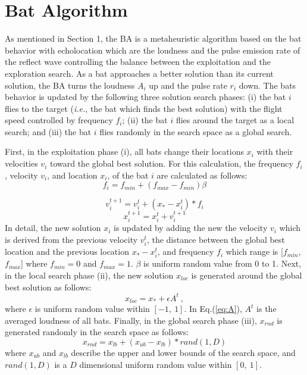 \section{Bat Algorithm}
As mentioned in Section 1, the BA is a metaheuristic algorithm based on the bat behavior with echolocation which are the loudness and the pulse emission rate of the reflect wave controlling the balance between the exploitation and the exploration search. As a bat approaches a better solution than its current solution, the BA turns the loudness $A_i$ up and the pulse rate $r_i$ down. The bats behavior is updated by the following three solution search phases: (i) the bat $i$ flies to the target (\textit{i.e.}, the bat which finds the best solution) with the flight speed controlled by frequency $f_i$; (ii) the bat $i$ flies around the target as a local search; and (iii) the bat $i$ flies randomly in the search space as a global search.

First, in the exploitation phase (i), all bats change their locations $x_i$ with their velocities $v_i$ toward the global best solution. For this calculation, the frequency $f_i$, velocity $v_i$, and location $x_i$, of the bat $i$ are calculated as follows:
\begin{equation}
f_{i} =f_{min}+(f_{max}-f_{min}) \beta
\label{eq:freq} 
\end{equation}

\begin{equation}
v_i^{t+1}=v_i^t+(x_*-x_i^t)* f_i
\label{eq:vi}
\end{equation}
\begin{equation}
x_i^{t+1}=x_i^t+v_i^{t+1}
\label{eq:xi}
\end{equation}
In detail, the new solution $x_i$ is updated by adding the new the velocity ${v_i}$ which is derived from the previous velocity $v_i^t$, the distance between the global best location and the previous location $x_*-x_i^t$, and frequency $f_i$ which range is [${f_{min}}$, ${f_{max}}$] where ${f_{min}}=0$ and ${f_{max}}=1$. $\beta $ is uniform random value from 0 to 1. Next, in the local search phase (ii), the new solution $x_{loc}$ is generated around the global best solution as follows:
\begin{equation}
x_{loc}=x_{*}+ \epsilon A^t \ ,
\label{eq:loc}
\end{equation}
where ${\epsilon}$ is uniform random value within ${[-1,  \ 1]}$. In Eq.(\ref{eq:A}), ${A^t}$ is the averaged loudness of all bats. Finally, in the global search phase (iii), $x_{rnd}$ is generated randomly in the search space as follows:
\begin{equation}
\label{eq:xrnd}
x_{rnd}=x_{lb}+(x_{ub}-x_{lb})*rand(1,D)
\end{equation}
where $x_{ub}$ and $x_{lb}$ describe the upper and lower bounds of the search space, and $rand(1,D)$ is a $D$ dimensional uniform random value within $[0, \ 1]$. 


